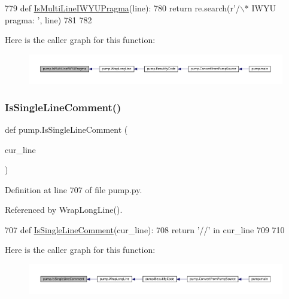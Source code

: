 \begin{DoxyCode}
779 \textcolor{keyword}{def }\hyperlink{namespacepump_a707a3ff4514c89607e48a87589aed787}{IsMultiLineIWYUPragma}(line):
780   \textcolor{keywordflow}{return} re.search(\textcolor{stringliteral}{r'/\(\backslash\)* IWYU pragma: '}, line)
781 
782 
\end{DoxyCode}
Here is the caller graph for this function\+:
\nopagebreak
\begin{figure}[H]
\begin{center}
\leavevmode
\includegraphics[width=350pt]{namespacepump_a707a3ff4514c89607e48a87589aed787_icgraph}
\end{center}
\end{figure}
\mbox{\label{namespacepump_a417078b1d036b67756c47e5dc50324dc}} 
\subsubsection{\texorpdfstring{Is\+Single\+Line\+Comment()}{IsSingleLineComment()}}
{\footnotesize\ttfamily def pump.\+Is\+Single\+Line\+Comment (\begin{DoxyParamCaption}\item[{}]{cur\+\_\+line }\end{DoxyParamCaption})}



Definition at line 707 of file pump.\+py.



Referenced by Wrap\+Long\+Line().


\begin{DoxyCode}
707 \textcolor{keyword}{def }\hyperlink{namespacepump_a417078b1d036b67756c47e5dc50324dc}{IsSingleLineComment}(cur\_line):
708   \textcolor{keywordflow}{return} \textcolor{stringliteral}{'//'} \textcolor{keywordflow}{in} cur\_line
709 
710 
\end{DoxyCode}
Here is the caller graph for this function\+:
\nopagebreak
\begin{figure}[H]
\begin{center}
\leavevmode
\includegraphics[width=350pt]{namespacepump_a417078b1d036b67756c47e5dc50324dc_icgraph}
\end{center}
\end{figure}
\mbox{\label{namespacepump_abcf26971f7bdbad77c2c168c110312df}} 
